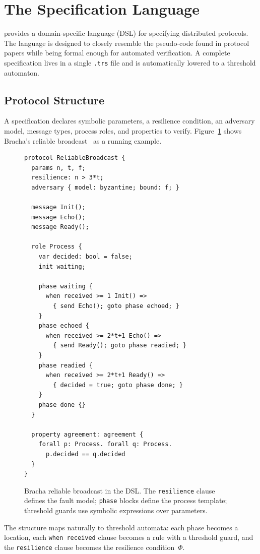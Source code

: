 \section{The \tarsier{} Specification Language}\label{sec:language}

\tarsier{} provides a domain-specific language (DSL) for specifying
distributed protocols.  The language is designed to closely resemble the
pseudo-code found in protocol papers while being formal enough for
automated verification.  A complete specification lives in a single
\texttt{.trs} file and is automatically lowered to a threshold automaton.

\subsection{Protocol Structure}

A specification declares symbolic parameters, a resilience condition, an
adversary model, message types, process roles, and properties to verify.
Figure~\ref{fig:rb-spec} shows Bracha's reliable
broadcast~\cite{Bracha1987} as a running example.

\begin{figure}[t]
\begin{lstlisting}
protocol ReliableBroadcast {
  params n, t, f;
  resilience: n > 3*t;
  adversary { model: byzantine; bound: f; }

  message Init();
  message Echo();
  message Ready();

  role Process {
    var decided: bool = false;
    init waiting;

    phase waiting {
      when received >= 1 Init() =>
        { send Echo(); goto phase echoed; }
    }
    phase echoed {
      when received >= 2*t+1 Echo() =>
        { send Ready(); goto phase readied; }
    }
    phase readied {
      when received >= 2*t+1 Ready() =>
        { decided = true; goto phase done; }
    }
    phase done {}
  }

  property agreement: agreement {
    forall p: Process. forall q: Process.
      p.decided == q.decided
  }
}
\end{lstlisting}
\caption{Bracha reliable broadcast in the \tarsier{} DSL.  The
\texttt{resilience} clause defines the fault model; \texttt{phase}
blocks define the process template; threshold guards use symbolic
expressions over parameters.}
\label{fig:rb-spec}
\end{figure}

The structure maps naturally to threshold automata: each phase becomes
a location, each \texttt{when received} clause becomes a rule with a
threshold guard, and the \texttt{resilience} clause becomes the
resilience condition~$\Phi$.

